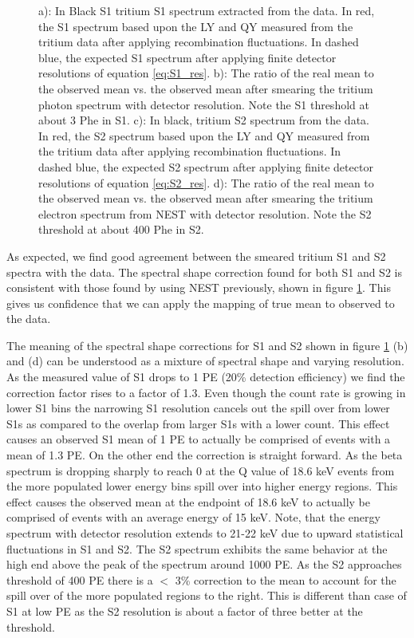 \begin{figure}[h!]
\caption{a): In Black S1 tritium S1 spectrum extracted from the data. In red, the S1 spectrum based upon the LY and QY measured from the tritium data after applying recombination fluctuations. In dashed blue, the expected S1 spectrum after applying finite detector resolutions of equation \ref{eq:S1_res}.  b): The ratio of the real mean to the observed mean vs. the observed mean after smearing the tritium photon spectrum with detector resolution. Note the S1 threshold at about 3 Phe in S1. c): In black, tritium S2 spectrum from the data. In red, the S2 spectrum based upon the LY and QY measured from the tritium data after applying recombination fluctuations. In dashed blue, the expected S2 spectrum after applying finite detector resolutions of equation \ref{eq:S2_res}. d): The ratio of the real mean to the observed mean vs. the observed mean after smearing the tritium electron spectrum from NEST with detector resolution. Note the S2 threshold at about 400 Phe in S2.   }
\label{fig:S1S2_mapping_2}
\end{figure}
\renewcommand{\baselinestretch}{2}
\small\normalsize


As expected, we find good agreement between the smeared tritium S1 and S2 spectra with the data. The spectral shape correction found for both S1 and S2 is consistent with those found by using NEST previously, shown in figure \ref{fig:S1S2_mapping_2}. This gives us confidence that we can apply the mapping of true mean to observed to the data. 

The meaning of the spectral shape corrections for S1 and S2 shown in figure \ref{fig:S1S2_mapping_2} (b) and (d) can be understood as a mixture of spectral shape and varying resolution. As the measured value of S1 drops to 1 PE (20\% detection efficiency) we find the correction factor rises to a factor of 1.3. Even though the count rate is growing in lower S1 bins the narrowing S1 resolution cancels out the spill over from lower S1s as compared to the overlap from larger S1s with a lower count. This effect causes an observed S1 mean of 1 PE to actually be comprised of events with a mean of 1.3 PE. On the other end the correction is straight forward. As the beta spectrum is dropping sharply to reach 0 at the Q value of 18.6 keV \cite{Tritium_Q} events from the more populated lower energy bins spill over into higher energy regions. This effect causes the observed mean at the endpoint of 18.6 keV to actually be comprised of events with an average energy of 15 keV. Note, that the energy spectrum with detector resolution extends to 21-22 keV due to upward statistical fluctuations in S1 and S2. The S2 spectrum exhibits the same behavior at the high end above the peak of the spectrum around 1000 PE. As the S2 approaches threshold of 400 PE there is a $<$ 3\% correction to the mean to account for the spill over of the more populated regions to the right. This is different than case of S1 at low PE as the S2 resolution is about a factor of three better at the threshold.

